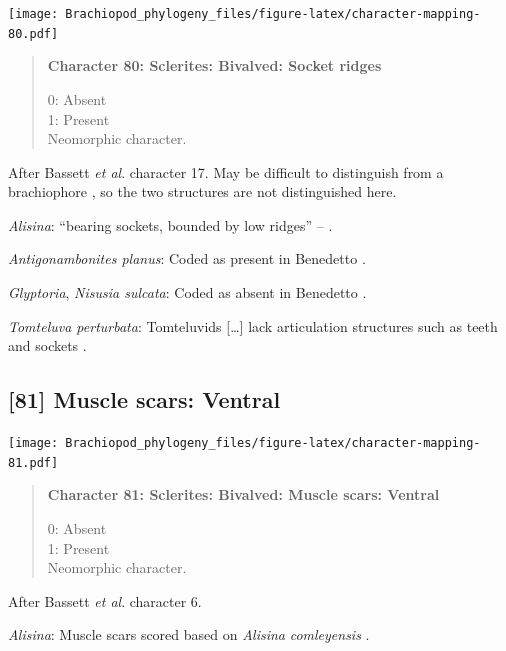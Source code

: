\documentclass[openany]{book}
\begin{document}
\texttt{[image: Brachiopod\_phylogeny\_files/figure-latex/character-mapping-80.pdf]}

\begin{quote}
\textbf{Character 80: Sclerites: Bivalved: Socket ridges}

0: Absent\\
1: Present\\
Neomorphic character.
\end{quote}

After Bassett \emph{et al}.
\citeyearpar{Bassett2001Functionalmorphology} character 17. May be
difficult to distinguish from a brachiophore \citep[see Fig 323
in][]{Williams1997Introduction}, so the two structures are not
distinguished here.

\hypertarget{Alisina-coding-80}{}
\emph{Alisina}: ``bearing sockets, bounded by low ridges'' --
\citet{Williams2000LinguliformeaCraniiformea}.

\hypertarget{Antigonambonites_planus-coding-80}{}
\emph{Antigonambonites planus}: Coded as present in Benedetto
\citeyearpar{Benedetto2009iChaniella}.

\hypertarget{Glyptoria-coding-80}{}
\emph{Glyptoria}, \emph{Nisusia sulcata}: Coded as absent in Benedetto
\citeyearpar{Benedetto2009iChaniella}.

\hypertarget{Tomteluva_perturbata-coding-80}{}
\emph{Tomteluva perturbata}: Tomteluvids {[}\ldots{}{]} lack
articulation structures such as teeth and sockets
\citep{Streng2016Anew}.

\subsection*{{[}81{]} Muscle scars: Ventral}\label{muscle-scars-ventral}

\texttt{[image: Brachiopod\_phylogeny\_files/figure-latex/character-mapping-81.pdf]}

\begin{quote}
\textbf{Character 81: Sclerites: Bivalved: Muscle scars: Ventral }

0: Absent\\
1: Present\\
Neomorphic character.
\end{quote}

After Bassett \emph{et al}.
\citeyearpar{Bassett2001Functionalmorphology} character 6.

\hypertarget{Alisina-coding-81}{}
\emph{Alisina}: Muscle scars scored based on \emph{Alisina}
\emph{comleyensis} \citep{Bassett2001Functionalmorphology}.
\end{document}
